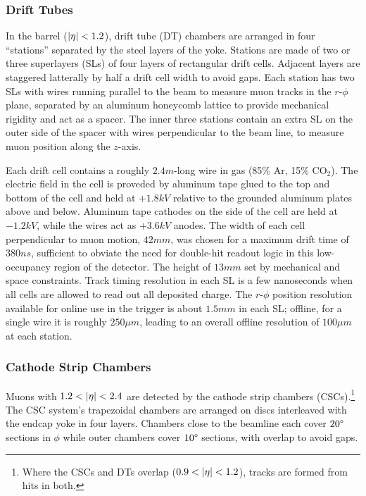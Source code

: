 \subsubsection{Drift Tubes}
In the barrel ($\lvert \eta \rvert < 1.2$), drift tube (DT) chambers are arranged in four ``stations'' separated by the steel layers of the yoke.
Stations are made of two or three superlayers (SLs) of four layers of rectangular drift cells.
Adjacent layers are staggered latterally by half a drift cell width to avoid gaps.
Each station has two SLs with wires running parallel to the beam to measure muon tracks in the $r$-$\phi$ plane, separated by an aluminum honeycomb lattice to provide mechanical rigidity and act as a spacer.
The inner three stations contain an extra SL on the outer side of the spacer with wires perpendicular to the beam line, to measure muon position along the $z$-axis.

Each drift cell contains a roughly $2.4\unit{m}$-long wire in gas (85\% Ar, 15\% CO$_2$).
The electric field in the cell is proveded by aluminum tape glued to the top and bottom of the cell and held at $+1.8\unit{kV}$ relative to the grounded aluminum plates above and below.
Aluminum tape cathodes on the side of the cell are held at $-1.2\unit{kV}$, while the wires act as $+3.6\unit{kV}$ anodes.
The width of each cell perpendicular to muon motion, $42\unit{mm}$, was chosen for a maximum drift time of $380\unit{ns}$, sufficient to obviate the need for double-hit readout logic in this low-occupancy region of the detector.
The height of $13\unit{mm}$ set by mechanical and space constraints.
Track timing resolution in each SL is a few nanoseconds when all cells are allowed to read out all deposited charge.
The $r$-$\phi$ position resolution available for online use in the trigger is about $1.5\unit{mm}$ in each SL\@; offline, for a single wire it is roughly $250\unit{\mu m}$, leading to an overall offline resolution of $100\unit{\mu m}$ at each station.


\subsubsection{Cathode Strip Chambers}
Muons with $1.2 < \lvert \eta \rvert < 2.4$ are detected by the cathode strip chambers (CSCs).\footnote{Where the CSCs and DTs overlap ($0.9 < \lvert \eta \rvert < 1.2$), tracks are formed from hits in both.}
The CSC system's trapezoidal chambers are arranged on discs interleaved with the endcap yoke in four layers.
Chambers close to the beamline each cover $20\degree$ sections in $\phi$ while outer chambers cover $10\degree$ sections, with overlap to avoid gaps.

